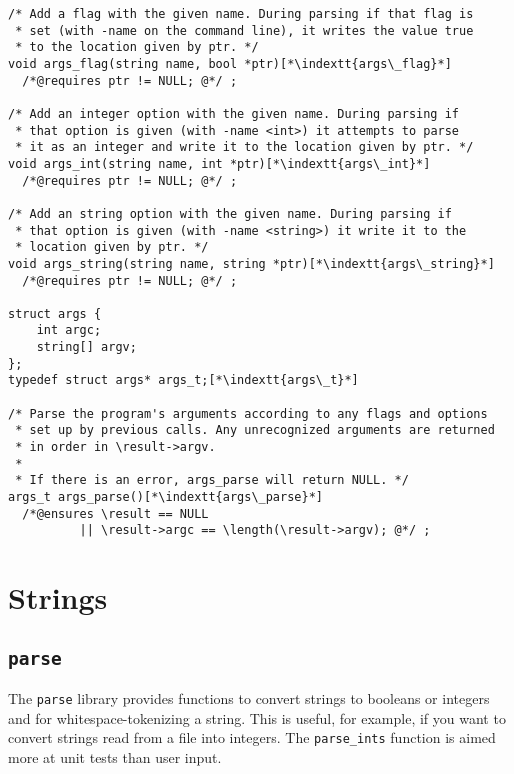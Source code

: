 \documentclass[11pt]{article}
\makeatletter
\newcommand{\indextt}[1]{\index{#1@\texttt{#1}}}
\makeatother
\begin{document}
\begin{lstlisting}
/* Add a flag with the given name. During parsing if that flag is
 * set (with -name on the command line), it writes the value true
 * to the location given by ptr. */
void args_flag(string name, bool *ptr)[*\indextt{args\_flag}*]
  /*@requires ptr != NULL; @*/ ;

/* Add an integer option with the given name. During parsing if
 * that option is given (with -name <int>) it attempts to parse
 * it as an integer and write it to the location given by ptr. */
void args_int(string name, int *ptr)[*\indextt{args\_int}*]
  /*@requires ptr != NULL; @*/ ;

/* Add an string option with the given name. During parsing if
 * that option is given (with -name <string>) it write it to the
 * location given by ptr. */
void args_string(string name, string *ptr)[*\indextt{args\_string}*]
  /*@requires ptr != NULL; @*/ ;

struct args {
    int argc;
    string[] argv;
};
typedef struct args* args_t;[*\indextt{args\_t}*]

/* Parse the program's arguments according to any flags and options
 * set up by previous calls. Any unrecognized arguments are returned
 * in order in \result->argv.
 *
 * If there is an error, args_parse will return NULL. */
args_t args_parse()[*\indextt{args\_parse}*]
  /*@ensures \result == NULL
          || \result->argc == \length(\result->argv); @*/ ;
\end{lstlisting}


\section{Strings}

\subsection{\tt parse}

The \lstinline'parse' library provides functions to convert strings to
booleans or integers and for whitespace-tokenizing a string.  This is
useful, for example, if you want to convert strings read from a file
into integers. The \lstinline'parse_ints' function is aimed more at unit
tests than user input.
\end{document}
